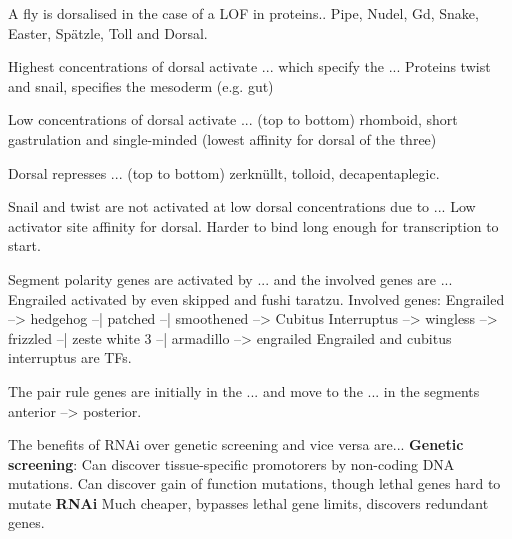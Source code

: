\begin{flashcard}{A fly is dorsalised in the case of a LOF in proteins..}
    Pipe, Nudel, Gd, Snake, Easter, Spätzle, Toll and Dorsal.
\end{flashcard}

\begin{flashcard}{Highest concentrations of dorsal activate ... which specify the ...}
    Proteins twist and snail, specifies the mesoderm (e.g. gut)
\end{flashcard}

\begin{flashcard}{Low concentrations of dorsal activate ... (top to bottom)}
    rhomboid, short gastrulation and single-minded (lowest affinity for dorsal of the three) 
\end{flashcard}

\begin{flashcard}{Dorsal represses ... (top to bottom)}
    zerknüllt, tolloid, decapentaplegic.
\end{flashcard}

\begin{flashcard}{Snail and twist are not activated at low dorsal concentrations due to ...}
    Low activator site affinity for dorsal. Harder to bind long enough for transcription to start. 
\end{flashcard}




\begin{flashcard}{Segment polarity genes are activated by ... and the involved genes are ...}
    Engrailed activated by even skipped and fushi taratzu. Involved genes:
    Engrailed --> hedgehog --| patched --| smoothened --> Cubitus Interruptus --> wingless --> frizzled --| zeste white 3 --| armadillo --> engrailed
    Engrailed and cubitus interruptus are TFs. 
\end{flashcard}

\begin{flashcard}{The pair rule genes are initially in the ... and move to the ... in the segments}
    anterior --> posterior.
\end{flashcard}

\begin{flashcard}{The benefits of RNAi over genetic screening and vice versa are...}
    \textbf{Genetic screening}: Can discover tissue-specific promotorers by non-coding DNA mutations. Can discover gain of function mutations, though lethal genes hard to mutate
    \textbf{RNAi} Much cheaper, bypasses lethal gene limits, discovers redundant genes.
\end{flashcard}

